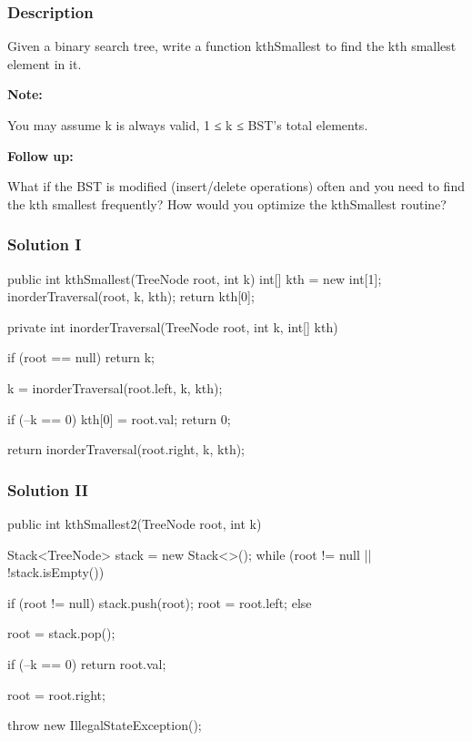 \subsubsection{Description}
Given a binary search tree, write a function kthSmallest to find the kth smallest element in it.

\textbf{Note:}

You may assume k is always valid, 1 ≤ k ≤ BST's total elements.

\textbf{Follow up:}

What if the BST is modified (insert/delete operations) often and you need to find the kth smallest frequently? How would you optimize the kthSmallest routine?

\subsubsection{Solution I}

\begin{Code}
public int kthSmallest(TreeNode root, int k) {
    int[] kth = new int[1];
    inorderTraversal(root, k, kth);
    return kth[0];
}

private int inorderTraversal(TreeNode root, int k, int[] kth) {
    if (root == null) {
        return k;
    }

    k = inorderTraversal(root.left, k, kth);

    if (--k == 0) {
        kth[0] = root.val;
        return 0;
    }

    return inorderTraversal(root.right, k, kth);
}
\end{Code}

\subsubsection{Solution II}

\begin{Code}
public int kthSmallest2(TreeNode root, int k) {
    Stack<TreeNode> stack = new Stack<>();
    while (root != null || !stack.isEmpty()) {
        if (root != null) {
            stack.push(root);
            root = root.left;
        } else {
            root = stack.pop();

            if (--k == 0) {
                return root.val;
            }

            root = root.right;
        }
    }
    throw new IllegalStateException();
}
\end{Code}

\newpage

